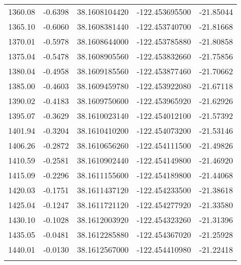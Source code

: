 \begin{longtable}{p{2.5cm}p{2.5cm}p{3cm}p{3cm}p{2.5cm}}
      1360.08  & 	-0.6398 &               38.1608104420  &   -122.453695500   &	-21.85044 \\
      1365.10  & 	-0.6060 &               38.1608381440  &   -122.453740700   &	-21.81668 \\
      1370.01  & 	-0.5978 &               38.1608644000  &   -122.453785880   &	-21.80858 \\
      1375.04  & 	-0.5478 &               38.1608905560  &   -122.453832660   &	-21.75856 \\
      1380.04  & 	-0.4958 &               38.1609185560  &   -122.453877460   &	-21.70662 \\
      1385.00  & 	-0.4603 &               38.1609459780  &   -122.453922080   &	-21.67118 \\
      1390.02  & 	-0.4183 &               38.1609750600  &   -122.453965920   &	-21.62926 \\
      1395.07  & 	-0.3629 &               38.1610023140  &   -122.454012100   &	-21.57392 \\
      1401.94  & 	-0.3204 &               38.1610410200  &   -122.454073200   &	-21.53146 \\
      1406.26  & 	-0.2872 &               38.1610656260  &   -122.454111500   &	-21.49826 \\
      1410.59  & 	-0.2581 &               38.1610902440  &   -122.454149800   &	-21.46920 \\
      1415.09  & 	-0.2296 &               38.1611155600  &   -122.454189800   &	-21.44068 \\
      1420.03  & 	-0.1751 &               38.1611437120  &   -122.454233500   &	-21.38618 \\
      1425.04  & 	-0.1247 &               38.1611721120  &   -122.454277920   &	-21.33580 \\
      1430.10  & 	-0.1028 &               38.1612003920  &   -122.454323260   &	-21.31396 \\
      1435.05  & 	-0.0481 &               38.1612285880  &   -122.454367020   &	-21.25928 \\
      1440.01  & 	-0.0130 &               38.1612567000  &   -122.454410980   &	-21.22418 \\ \bottomrule
 	\label{tab:Pista}
\end{longtable}
